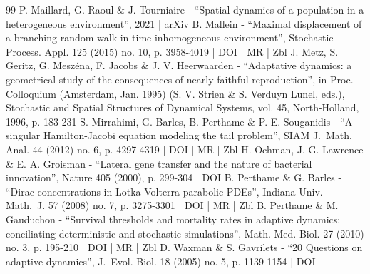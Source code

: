 \begin{thebibliography}{99}
P. Maillard, G. Raoul \& J. Tourniaire - “Spatial dynamics of a population in a heterogeneous environment”, 2021 | arXiv
B. Mallein - “Maximal displacement of a branching random walk in time-inhomogeneous environment”, Stochastic Process. Appl. 125 (2015) no. 10, p. 3958-4019 | DOI | MR | Zbl
J. Metz, S. Geritz, G. Meszéna, F. Jacobs \& J. V. Heerwaarden - “Adaptative dynamics: a geometrical study of the consequences of nearly faithful reproduction”, in Proc. Colloquium (Amsterdam, Jan. 1995) (S. V. Strien \& S. Verduyn Lunel, eds.), Stochastic and Spatial Structures of Dynamical Systems, vol. 45, North-Holland, 1996, p. 183-231
S. Mirrahimi, G. Barles, B. Perthame \& P. E. Souganidis - “A singular Hamilton-Jacobi equation modeling the tail problem”, SIAM J. Math. Anal. 44 (2012) no. 6, p. 4297-4319 | DOI | MR | Zbl
H. Ochman, J. G. Lawrence \& E. A. Groisman - “Lateral gene transfer and the nature of bacterial innovation”, Nature 405 (2000), p. 299-304 | DOI
B. Perthame \& G. Barles - “Dirac concentrations in Lotka-Volterra parabolic PDEs”, Indiana Univ. Math. J. 57 (2008) no. 7, p. 3275-3301 | DOI | MR | Zbl
B. Perthame \& M. Gauduchon - “Survival thresholds and mortality rates in adaptive dynamics: conciliating deterministic and stochastic simulations”, Math. Med. Biol. 27 (2010) no. 3, p. 195-210 | DOI | MR | Zbl
D. Waxman \& S. Gavrilets - “20 Questions on adaptive dynamics”, J. Evol. Biol. 18 (2005) no. 5, p. 1139-1154 | DOI
\end{thebibliography}
